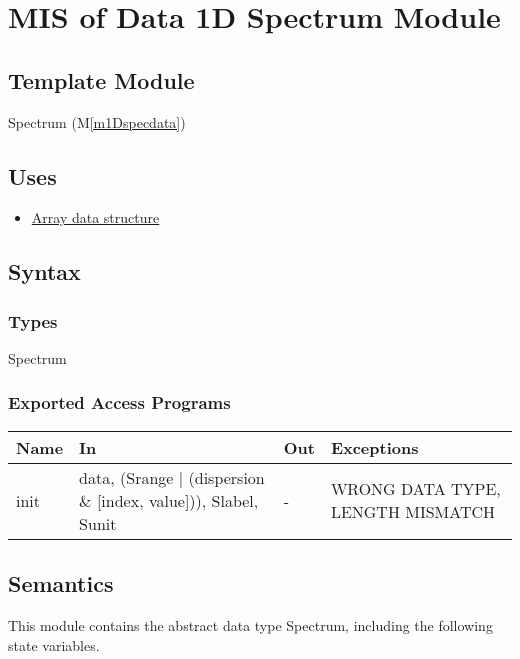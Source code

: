 \documentclass[12pt, titlepage]{article}
\newcommand{\mref}[1]{M\ref{#1}}
\begin{document}
\section{MIS of Data 1D Spectrum Module} \label{Mod:Spectrum}
\subsection{Template Module}
Spectrum (\mref{m1Dspecdata})

\subsection{Uses}
\begin{itemize}
    \item \hyperref[Mod:Array]{Array data structure}
\end{itemize}

\subsection{Syntax}

\subsubsection{Types}
Spectrum

\subsubsection{Exported Access Programs}

\begin{center}
    \begin{tabular}{p{1.5cm} p{4cm} p{4cm} p{4cm}}
        \toprule
        \textbf{Name} & \textbf{In} & \textbf{Out} & \textbf{Exceptions} \\
        \midrule
        init & data, (Srange $|$ (dispersion $\&$ [index, value])), Slabel, Sunit & - &
        WRONG DATA TYPE, LENGTH MISMATCH \\
        \bottomrule
    \end{tabular}
\end{center}

\subsection{Semantics}
This module contains the abstract data type Spectrum, including the following
state variables.
\end{document}
